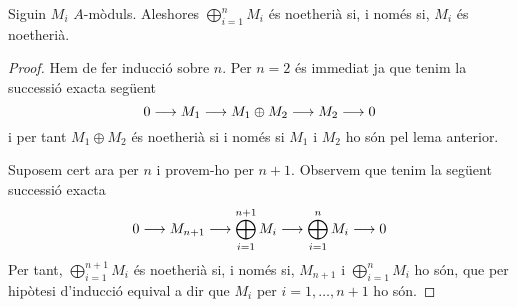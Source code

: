 \documentclass[../../../main.tex]{subfiles}
\begin{document}
\begin{coro}
\label{coro:noetheriaSumaDirecta} Siguin $M_i$ $A$-mòduls. Aleshores $\bigoplus_{i=1}^nM_i$ és noetherià si, i només si, $M_i$ és noetherià.
\end{coro}
\begin{proof}
Hem de fer inducció sobre $n$. Per $n = 2$ és immediat ja que tenim la successió exacta següent
\begin{equation}
    \notag
    0\longrightarrow M_1\longrightarrow M_1\oplus M_2\longrightarrow M_2\longrightarrow 0
\end{equation}
i per tant $M_1\oplus M_2$ és noetherià si i només si $M_1$ i $M_2$ ho són pel lema anterior.

Suposem cert ara per $n$ i provem-ho per $n+1$. Observem que tenim la següent successió exacta
\begin{equation}
    \notag
    0\longrightarrow M_{n+1}\longrightarrow \bigoplus_{i=1}^{n+1}M_i\longrightarrow \bigoplus_{i=1}^nM_i\longrightarrow 0
\end{equation}
Per tant, $\bigoplus_{i=1}^{n+1}M_i$ és noetherià si, i només si, $M_{n+1}$ i $\bigoplus_{i=1}^nM_i$ ho són, que per hipòtesi d'inducció equival a dir que $M_i$ per $i=1,\ldots,n+1$ ho són.
\end{proof}
\end{document}
